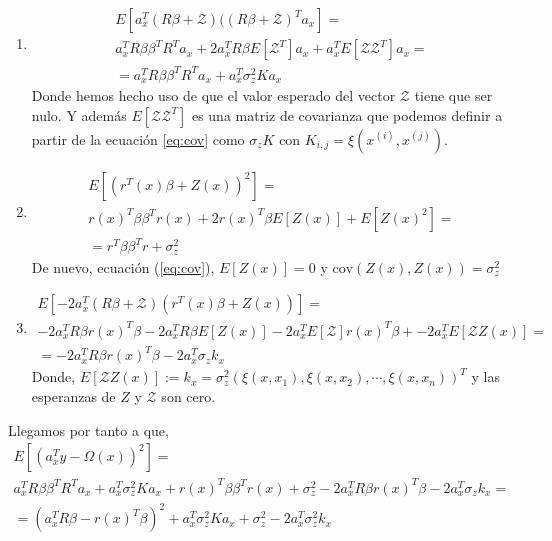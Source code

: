 \documentclass[10pt,a4paper]{report}
\begin{document}
\begin{enumerate}
\item \begin{equation}
\begin{split}
E[a_x^T(R\beta+\mathcal{Z})((R\beta+\mathcal{Z})^Ta_x] =\\
a_x^TR\beta\beta^TR^Ta_x +2a_x^TR\beta E[\mathcal{Z}^T]a_x + a_x^TE[\mathcal{Z}\mathcal{Z}^T]a_x=\\
=a_x^TR\beta\beta^TR^Ta_x +a_x^T\sigma_z^2Ka_x
\end{split}
\end{equation}
Donde hemos hecho uso de que el valor esperado del vector $\mathcal{Z}$ tiene que ser nulo. Y además $E[\mathcal{Z}\mathcal{Z}^T]$ es una matriz de covarianza que podemos definir a partir de la ecuación \ref{eq:cov} como $\sigma_zK$ con $K_{i,j} = \xi(x^{(i)},x^{(j)})$.  

\item \begin{equation}
\begin{split}
E[(r^T(x)\beta+Z(x))^2]=\\
r(x)^T\beta\beta^Tr(x) + 2r(x)^T\beta E[Z(x)] + E[Z(x)^2]=\\
= r^T\beta\beta^Tr + \sigma_z^2
\end{split}
\end{equation}
De nuevo, ecuación (\ref{eq:cov}),  $E[Z(x)] = 0$ y $\text{cov}(Z(x),Z(x)) = \sigma_z^2$

\item \begin{equation}
\begin{split}
E[-2a_x^T(R\beta + \mathcal{Z})(r^T(x)\beta +Z(x))]=\\
-2a_x^TR\beta r(x)^T\beta -2a_x^TR\beta E[Z(x)]-2a_x^TE[\mathcal{Z}]r(x)^T\beta + -2a_x^TE[\mathcal{Z}Z(x)]=\\
=-2a_x^TR\beta r(x)^T\beta -2a_x^T\sigma_zk_x
\end{split}
\end{equation}
Donde, $E[\mathcal{Z}Z(x)] := k_x = \sigma_z^2(\xi(x,x_1),\xi(x,x_2),\cdots,\xi(x,x_n))^T$ y las esperanzas de $Z$ y $\mathcal{Z}$ son cero.
\end{enumerate}
Llegamos por tanto a que,
\begin{equation}\label{eq:min}
\begin{split}
E[(a_x^Ty-\Omega(x))^2] =\\
a_x^TR\beta\beta^TR^Ta_x +a_x^T\sigma_z^2Ka_x+r(x)^T\beta\beta^Tr(x) + \sigma_z^2-2a_x^TR\beta r(x)^T\beta -2a_x^T\sigma_zk_x=\\
=(a_x^TR\beta-r(x)^T\beta)^2+a_x^T\sigma_z^2Ka_x+\sigma_z^2-2a_x^T\sigma_z^2 k_x
\end{split}
\end{equation}
\end{document}
